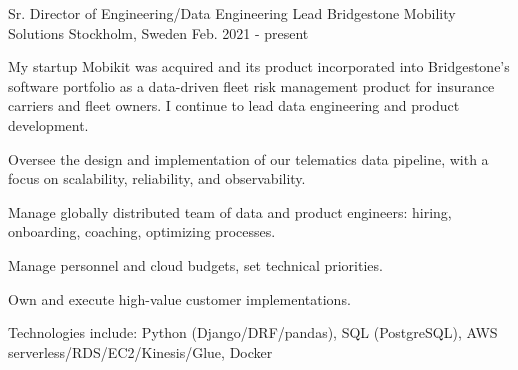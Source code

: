 

\begin{cventries}

  \cventry
    {Sr. Director of Engineering/Data Engineering Lead} %
    {Bridgestone Mobility Solutions} %
    {Stockholm, Sweden} %
    {Feb. 2021 - present} %
    {
    My startup Mobikit was acquired and its product incorporated into Bridgestone's software portfolio as a data-driven fleet risk management product for insurance carriers and fleet owners. I continue to lead data engineering and product development.
    \vspace{5.0mm}
      \begin{cvitems} %
        \item {Oversee the design and implementation of our telematics data pipeline, with a focus on scalability, reliability, and observability.}
        \item {Manage globally distributed team of data and product engineers: hiring, onboarding, coaching, optimizing processes.}
        \item {Manage personnel and cloud budgets, set technical priorities.}
        \item {Own and execute high-value customer implementations.}
        \item {Technologies include: Python (Django/DRF/pandas), SQL (PostgreSQL), AWS serverless/RDS/EC2/Kinesis/Glue, Docker}
      \end{cvitems}
    }


\end{cventries}
